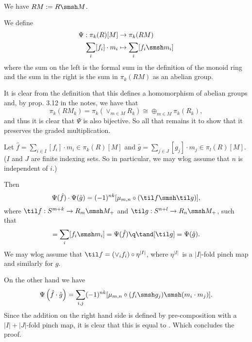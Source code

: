 
\DeclareMathOperator\map{map}
\def\op{\text{op}}



\mmaketitle

\begin{exercise}[1]\ 

\end{exercise}


\begin{exercise}[2]\ 

We have $RM := R \smsh M$.

We define 
\begin{align*}
\Psi : \pi_k(R)[M] &\to \pi_k(RM) \\
\sum_i [f_i] \cdot m_i &\mapsto \sum_i [f_i \smsh m_i]
\end{align*}
where the sum on the left is the formal sum in the definition of the
monoid ring and the sum in the right is the sum in $\pi_k(RM)$ as an abelian
group.

It is clear from the definition that this defines a homomorphism of abelian
groups and, by prop. 3.12 in the notes, we have that 
\[ \pi_k(RM_k) = \pi_k(\vee_{m\in M} R_k) \cong \oplus_{m\in M} \pi_k(R_k), \]
and thus it is clear that $\Psi$ is also bijective. 
So all that remains it to show that it preserves the graded multiplication.

Let $\hat f = \sum_{i\in I} [f_i] \cdot m_i \in \pi_k(R)[M]$ and $\hat g =
\sum_{j\in J} [g_j] \cdot m_j \in \pi_l(R)[M]$. ($I$ and $J$ are finite indexing
sets. So in particular, we may wlog assume that $n$ is independent of $i$.)

Then 
\begin{equation}
\label{eq:5.2.a}
\Psi(\hat f) \cdot \Psi(\hat g) = (-1)^{nk} [\mu_{m,n} \circ (\til f
\smsh \til g)], 
\end{equation}
where $\til f: S^{m+k} \to R_m \smsh M_+$ and $\til g: S^{n+l} \to R_n \smsh
M_+$, such that 
\begin{equation*}
[\til f] = \sum_i [f_i \smsh m_i] = \Psi(\hat f) \q\tand 
[\til g] = \Psi(\hat g).
\end{equation*}
We may wlog assume that $\til f = (\vee_i f_i) \circ \eta^{|I|}$, where $\eta^{|I|}$ is a
$|I|$-fold pinch map and similarly for $g$.

On the other hand we have 
\[ \Psi\left(\hat f \cdot \hat g\right) = \sum_{i,j} (-1)^{nk} [\mu_{m,n} \circ (f_i \smsh
g_j) \smsh (m_i \cdot m_j)]. \] 
Since the addition on the right hand side is defined by pre-composition with a
$|I|+|J|$-fold pinch map, it is clear that this is equal to .
Which concludes the proof.
\end{exercise}


